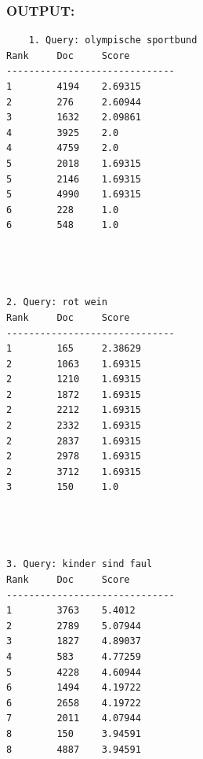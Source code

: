 \documentclass[a4paper]{scrartcl}
\begin{document}
\subsubsection*{OUTPUT:}
\begin{lstlisting}
    1. Query: olympische sportbund
Rank     Doc     Score
------------------------------
1        4194    2.69315
2        276     2.60944
3        1632    2.09861
4        3925    2.0
4        4759    2.0
5        2018    1.69315
5        2146    1.69315
5        4990    1.69315
6        228     1.0
6        548     1.0




2. Query: rot wein
Rank     Doc     Score
------------------------------
1        165     2.38629
2        1063    1.69315
2        1210    1.69315
2        1872    1.69315
2        2212    1.69315
2        2332    1.69315
2        2837    1.69315
2        2978    1.69315
2        3712    1.69315
3        150     1.0




3. Query: kinder sind faul
Rank     Doc     Score
------------------------------
1        3763    5.4012
2        2789    5.07944
3        1827    4.89037
4        583     4.77259
5        4228    4.60944
6        1494    4.19722
6        2658    4.19722
7        2011    4.07944
8        150     3.94591
8        4887    3.94591
\end{lstlisting}
\end{document}
